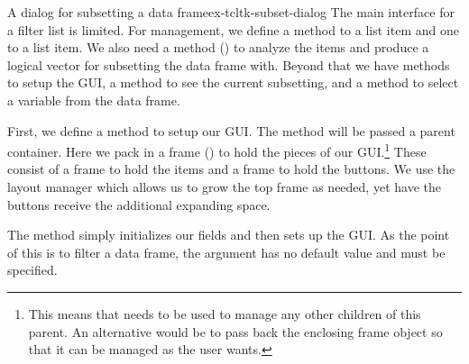 \begin{example}{A dialog for subsetting a data frame}{ex-tcltk-subset-dialog}
The main interface for a filter list is limited. For management, we
define a method to  a list item and one to  a
list item. We also need a method () to analyze the
items and produce a logical vector for subsetting the data frame with.
Beyond that we have methods to setup the GUI, a  method
to see the current subsetting, and a method to select a variable from
the data frame.


First, we define a method to setup our GUI. The 
method will be passed a parent container. Here we pack in a frame
() to hold the pieces of our GUI.\footnote{This
  means that  needs to be used to manage any other
  children of this parent.  An alternative would be to pass back the
  enclosing frame object so that it can be managed as the user wants.}
These consist of a frame to hold the items and a frame to hold the
buttons. We use the  layout manager which allows us
to grow the top frame as needed, yet have the buttons receive the
additional expanding space.

\begin{Schunk}
\end{Schunk}

The  method simply initializes our fields and then
sets up the GUI. As the point of this is to filter a data frame, the
 argument has no default value and must be specified.


\end{example}
